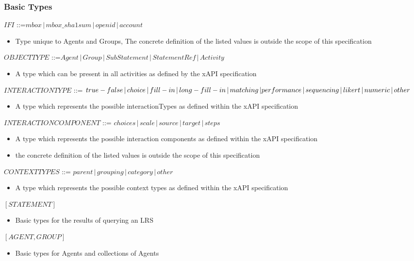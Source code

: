 \documentclass{article}
\begin{document}
  \subsubsection{Basic Types}
  $IFI$ ::=$ mbox \,|\, mbox\_sha1sum \,|\, openid \,|\, account$
  \begin{itemize}
  \item Type unique to Agents and Groups, The concrete definition of the listed values
    is outside the scope of this specification
  \end{itemize}
  $OBJECTTYPE$ ::=$ Agent \,|\, Group \,|\, SubStatement \,|\,
  StatementRef \,|\, Activity$
  \begin{itemize}
  \item A type which can be present in all activities as defined by
    the xAPI specification
  \end{itemize}
  $INTERACTIONTYPE$ ::= $true-false \,|\, choice \,|\, fill-in \,|\,
  long-fill-in \,|\, matching \,| \\ performance \,|\, sequencing \,|\,
  likert \,|\, numeric \,|\, other$
  \begin{itemize}
  \item A type which represents the possible interactionTypes as
      defined within the xAPI specification
  \end{itemize}
  $INTERACTIONCOMPONENT$ ::= $choices \,|\, scale \,|\, source \,|\,
  target \,|\, steps$
  \begin{itemize}
  \item A type which represents the possible interaction components as
    defined within the xAPI specification
  \item the concrete definition of the listed values is outside the
    scope of this specification
  \end{itemize}
  $CONTEXTTYPES$ ::= $parent \,|\, grouping \,|\, category \,|\, other$
  \begin{itemize}
  \item A type which represents the possible context types as
    defined within the xAPI specification
  \end{itemize}
  $[STATEMENT]$
  \begin{itemize}
  \item Basic types for the results of querying an LRS
  \end{itemize}
  $[AGENT, GROUP]$
  \begin{itemize}
  \item Basic types for Agents and collections of Agents
  \end{itemize}
\end{document}

